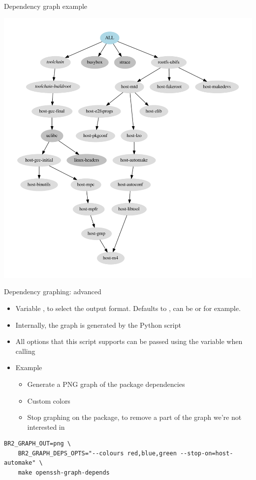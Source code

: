 \begin{frame}{Dependency graph example}
  \begin{center}
    \includegraphics[height=0.8\textheight]{slides/buildroot-analysis/graph-depends.pdf}
  \end{center}
\end{frame}

\begin{frame}[fragile]{Dependency graphing: advanced}
  \begin{itemize}
  \item Variable , to select the output
    format. Defaults to , can be  or 
    for example.
  \item Internally, the graph is generated by the Python script
  \item All options that this script supports can be passed using the
     variable when calling 
  \item Example
    \begin{itemize}
    \item Generate a PNG graph of the  package
      dependencies
    \item Custom colors
    \item Stop graphing on the  package, to remove
      a part of the graph we're not interested in
    \end{itemize}
  \end{itemize}

  \begin{block}{}
{\tiny
\begin{verbatim}
BR2_GRAPH_OUT=png \
    BR2_GRAPH_DEPS_OPTS="--colours red,blue,green --stop-on=host-automake" \
    make openssh-graph-depends
\end{verbatim}}
  \end{block}
\end{frame}

